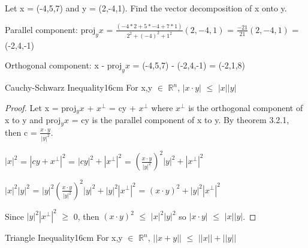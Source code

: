     \vspace{0.5cm}



    \begin{example}
        Let x = (-4,5,7) and y = (2,-4,1). Find the vector decomposition
        of x onto y.
    \end{example}

    \begin{tbox}
        Parallel component:
        \hspace{0.5cm}
        $\text{proj}_yx$
        = $\frac{(-4*2 + 5*-4 + 7*1)}{2^2 + (-4)^2 + 1^2}(2,-4,1)$
        = $\frac{-21}{21}(2,-4,1)$ = (-2,4,-1)

        Orthogonal component:
        \hspace{0.5cm}
        x - $\text{proj}_yx$
        = (-4,5,7) - (-2,4,-1)
        = (-2,1,8)
    \end{tbox}

    \newpage



    \begin{wtheorem}{Cauchy-Schwarz Inequality}{16cm}
        For x,y $\in$ $\mathbb{R}^n$,
        $|x \cdot y|$ $\leq$ $|x| |y|$
    \end{wtheorem}

    \begin{proof}
        Let x = proj$_yx$ + $x^{\perp}$ = cy + $x^{\perp}$
        where $x^{\perp}$ is the orthogonal component of x to y and
        proj$_yx$ = cy is the parallel component of x to y.
        By {\color{red} theorem 3.2.1}, then c = $\frac{x \cdot y}{|y|^2}$.

        \hspace{0.5cm}
        $|x|^2$
        = $|cy+x^{\perp}|^2$
        = $|cy|^2 + |x^{\perp}|^2$
        = $(\frac{x \cdot y}{|y|^2})^2 |y|^2 + |x^{\perp}|^2$

        \hspace{0.5cm}
        $|x|^2 |y|^2$
        = $|y|^2(\frac{x \cdot y}{|y|^2})^2 |y|^2 + |y|^2 |x^{\perp}|^2$
        = $(x \cdot y)^2 + |y|^2 |x^{\perp}|^2$

        Since $|y|^2 |x^{\perp}|^2$ $\geq$ 0, then
        $(x \cdot y)^2$ $\leq$ $|x|^2 |y|^2$
        so $|x \cdot y|$ $\leq$ $|x| |y|$.
    \end{proof}

    \vspace{0.5cm}



    \begin{corollary}{Triangle Inequality}{16cm}
        For x,y $\in$ $\mathbb{R}^n$,
        $||x+y||$ $\leq$ $||x|| + ||y||$
    \end{corollary}

